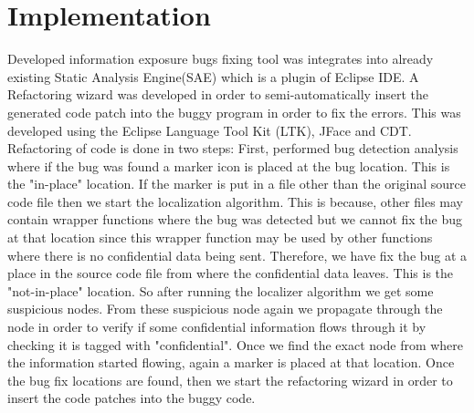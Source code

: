 \chapter{Implementation}
\label{chapter:impl}


Developed information exposure bugs fixing tool was integrates into already existing Static Analysis Engine(SAE) which
is a plugin of Eclipse IDE. A Refactoring wizard was developed in order to semi-automatically insert the generated code patch
into the buggy program in order to fix the errors. This was developed using the Eclipse Language Tool Kit (LTK), JFace and 
CDT. Refactoring of code is done in two steps: First, performed bug detection analysis where if the bug was found
a marker icon is placed at the bug location. This is the "in-place" location. If the marker is put in a file other than
the original source code file then we start the localization algorithm. This is because, other files may contain
wrapper functions where the bug was detected but we cannot fix the bug at that location since this
wrapper function may be used by other functions where there is no confidential data being sent. Therefore,
we have fix the bug at 
a place in the source code file from where the confidential data leaves. This is the "not-in-place" location.
So after running the localizer algorithm we get some suspicious nodes. From these suspicious node again we propagate
through the node in order to verify if some confidential 
information flows through it by checking it is tagged with "confidential". Once we find the exact node from where
 the information started flowing, again a marker is placed at that location. Once the bug fix locations are found, then 
 we start the refactoring wizard in order to insert the code patches into the buggy code.


